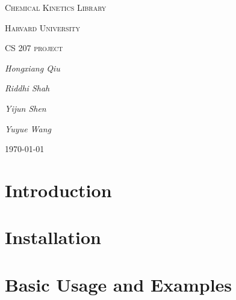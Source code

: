 \documentclass[12pt,a4paper]{report}
\begin{document}
\begin{titlepage}
\centering
{\scshape\LARGE Chemical Kinetics Library \par}
\vspace{1cm}
{\scshape\Large Harvard University\par}
\vspace{0.5cm}
{\scshape\Large CS 207 project\par}
\vspace{1.5cm}
\vfill
{\Large\itshape Hongxiang Qiu\par}
{\Large\itshape Riddhi Shah\par}
{\Large\itshape Yijun Shen\par}
{\Large\itshape Yuyue Wang\par}
\vfill
{\large \today\par}
\end{titlepage}
\renewcommand{\thesection}{\arabic{section}}
\tableofcontents
\section{Introduction}

\section{Installation}
\section{Basic Usage and Examples}
\end{document}
